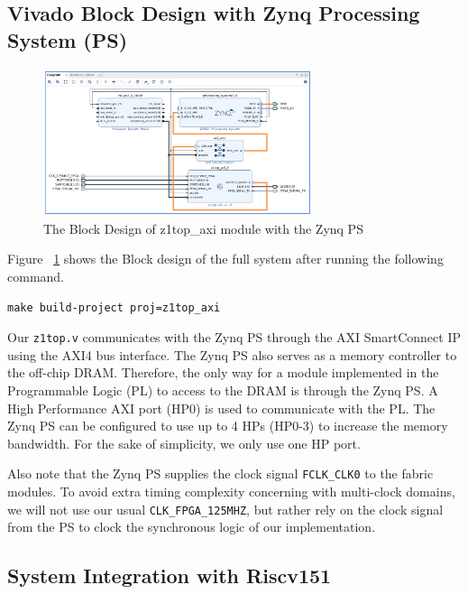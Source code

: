 \documentclass[11pt]{article}
\begin{document}
\newpage
\subsection{Vivado Block Design with Zynq Processing System (PS)}

\begin{figure}[hbt]
\begin{center}
  \includegraphics[width=0.7\textwidth]{images/vivado_bd_z1top_axi.png}
  \caption{The Block Design of z1top\_axi module with the Zynq PS}
  \label{fig:z1top_axi}
\end{center}
\end{figure}

Figure ~\ref{fig:z1top_axi} shows the Block design of the full system after running the following command.

\begin{verbatim}
make build-project proj=z1top_axi
\end{verbatim}

Our \verb|z1top.v| communicates with the Zynq PS through the AXI SmartConnect IP using the AXI4 bus interface. The Zynq PS also serves as a memory controller to the off-chip DRAM. Therefore, the only way for a module implemented in the Programmable Logic (PL) to access to the DRAM is through the Zynq PS. A High Performance AXI port (HP0) is used to communicate with the PL. The Zynq PS can be configured to use up to 4 HPs (HP0-3) to increase the memory bandwidth. For the sake of simplicity, we only use one HP port.

Also note that the Zynq PS supplies the clock signal \verb|FCLK_CLK0| to the fabric modules. To avoid extra timing complexity concerning with multi-clock domains, we will not use our usual \verb|CLK_FPGA_125MHZ|, but rather rely on the clock signal from the PS to clock the synchronous logic of our implementation.

\subsection{System Integration with Riscv151}
\end{document}
